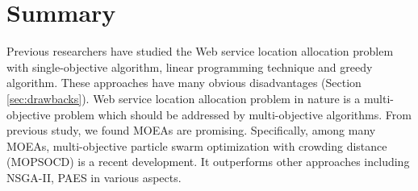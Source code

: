 \section{Summary}

Previous researchers have studied the Web service location allocation problem with single-objective algorithm, linear programming technique and 
greedy algorithm. These approaches have many obvious disadvantages (Section \ref{sec:drawbacks}). 
Web service location allocation problem in nature is a multi-objective problem which should be addressed by multi-objective algorithms. 
From previous study, we found MOEAs are promising. Specifically, among many MOEAs, 
multi-objective particle swarm optimization with crowding distance (MOPSOCD) is a recent development. It outperforms other approaches including NSGA-II, PAES
in various aspects. 
